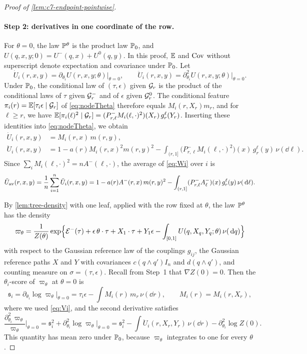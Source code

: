 \begin{proof}[Proof of \cref{lem:c7-endpoint-pointwise}]
\paragraph{Step 2: derivatives in one coordinate of the row.}
For $\theta=0$, the law $\mathbb P^\theta$ is the product law $\mathbb P_0$, and
$U(q,x,y;0)=U^-(q,x)+U^0(q,y)$. In this proof, $\mathbb E$ and $\operatorname{Cov}$ without
superscript denote expectation and covariance under $\mathbb P_0$. Let
\[
 \dot U_i(r,x,y)=\partial_{\theta_i}U(r,x,y;\theta)\big|_{\theta=0},
 \qquad
 \ddot U_i(r,x,y)=\partial_{\theta_i}^2U(r,x,y;\theta)\big|_{\theta=0}.
\]
Under $\mathbb P_0$, the conditional law of $(\tau,\epsilon)$ given $\mathcal G_r$
is the product of the conditional laws of $\tau$ given $\mathcal G^-_r$ and
of $\epsilon$ given $\mathcal G^0_r$. The conditional feature
$\pi_i(r)=\mathbb E[\tau_i\epsilon\mid\mathcal G_r]$ of \eqref{eq:nodeTheta}
therefore equals $M_i(r,X_r)m_r$, and for $\ell\ge r$, we have
$\mathbb E[\pi_i(\ell)^2\mid\mathcal G_r]=(P^-_{r,\ell}M_i(\ell,\cdot)^2)(X_r)\,
g_r^\ell(Y_r)$. Inserting these identities into \eqref{eq:nodeTheta}, we obtain
\begin{align}
 \dot U_i(r,x,y)&=M_i(r,x)\,m(r,y),\label{eq:Vi}\\
 \ddot U_i(r,x,y)&=1-a(r)M_i(r,x)^2m(r,y)^2
 -\int_{(r,1]}\bigl(P^-_{r,\ell}M_i(\ell,\cdot)^2\bigr)(x)\,
 g_r^\ell(y)\,\nu(\dd\ell).
 \label{eq:Wi}
\end{align}
Since $\sum_iM_i(\ell,\cdot)^2=nA^-(\ell,\cdot)$, the average of
\eqref{eq:Wi} over $i$ is
\begin{equation}\label{eq:c7-average}
 \ddot U_{\rm av}(r,x,y)=\frac1n\sum_{i=1}^n\ddot U_i(r,x,y)
 =1-a(r)A^-(r,x)\,m(r,y)^2
 -\int_{(r,1]}(P^-_{r,\ell}A^-_\ell)(x)\,g_r^\ell(y)\,\nu(\,\mathrm d\ell).
\end{equation}

By \cref{lem:tree-density} with one leaf, applied with the row fixed
at $\theta$, the law $\mathbb P^\theta$ has the density
\[
 \varpi_\theta=\frac1{Z(\theta)}\exp\Bigl\{\mathcal E^-(\tau)
 +\epsilon\,\theta\cdot\tau+X_1\cdot\tau+Y_1\epsilon
 -\int_{[0,1]}U(q,X_q,Y_q;\theta)\,\nu(\,\mathrm d q)\Bigr\}
\]
with respect to the Gaussian reference law of the couplings $g_{ij}$,
the Gaussian reference paths $X$ and $Y$ with covariances
$c(q\wedge q')I_n$ and $d(q\wedge q')$, and counting measure on
$\sigma=(\tau,\epsilon)$. Recall from Step~1 that $\nabla Z(0)=0$.
Then the $\theta_i$-score of $\varpi_\theta$ at $\theta=0$ is
\[
 \mathfrak s_i=\partial_{\theta_i}\log\varpi_\theta\big|_{\theta=0}
 =\tau_i\epsilon-\int M_i(r)\,m_r\,\nu(\dd r),
 \qquad M_i(r)=M_i(r,X_r),
\]
where we used \eqref{eq:Vi}, and the second derivative satisfies
\begin{equation}\label{eq:c7-density-hessian}
 \frac{\partial_{\theta_i}^2\varpi_\theta}{\varpi_\theta}\Big|_{\theta=0}
 =\mathfrak s_i^2+\partial_{\theta_i}^2\log\varpi_\theta\big|_{\theta=0}
 =\mathfrak s_i^2-\int\ddot U_i(r,X_r,Y_r)\,\nu(\dd r)
 -\partial_{\theta_i}^2\log Z(0).
\end{equation}
This quantity has mean zero under $\mathbb P_0$, because $\varpi_\theta$
integrates to one for every $\theta$.


\end{proof}
